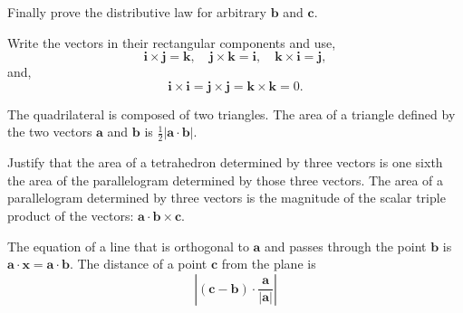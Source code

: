 {\begin{Hint}
Finally prove the distributive law for arbitrary $\mathbf{b}$ and $\mathbf{c}$.
\end{Hint}







\begin{Hint}
\label{hint matrix form of cross product}
Write the vectors in their rectangular components and use,
\[
\mathbf{i} \times \mathbf{j} = \mathbf{k}, \quad
\mathbf{j} \times \mathbf{k} = \mathbf{i}, \quad
\mathbf{k} \times \mathbf{i} = \mathbf{j},
\]
and, 
\[
\mathbf{i} \times \mathbf{i} = 
\mathbf{j} \times \mathbf{j} = 
\mathbf{k} \times \mathbf{k} = 0.
\]
\end{Hint}



\begin{Hint}
\label{hint area quadrilateral 11 42 37 23}
The quadrilateral is composed of two triangles.
The area of a triangle defined by the two vectors $\mathbf{a}$ and 
$\mathbf{b}$ is $\frac{1}{2} | \mathbf{a} \cdot \mathbf{b} |$.
\end{Hint}





\begin{Hint}
\label{hint volume tetrahedron 110 321 241 125}
Justify that the area of a tetrahedron determined by three vectors is one 
sixth the area of the parallelogram determined by those three vectors.
The area of a parallelogram determined by three vectors is the magnitude of
the scalar triple product of the vectors: 
$\mathbf{a} \cdot \mathbf{b} \times \mathbf{c}$.
\end{Hint}







\begin{Hint}
\label{hint equation of plane 123 231 312}
The equation of a line that is orthogonal to $\mathbf{a}$ and passes
through the point $\mathbf{b}$ is $\mathbf{a} \cdot \mathbf{x} = 
\mathbf{a} \cdot \mathbf{b}$.  The distance of a point $\mathbf{c}$ 
from the plane is 
\[
\left | (\mathbf{c} - \mathbf{b} ) \cdot \frac{ \mathbf{a} }
{ | \mathbf{a} | } \right|
\]
\end{Hint}





\raggedbottom
}
